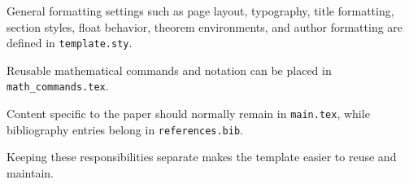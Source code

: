 \documentclass{article}
\begin{document}
	General formatting settings such as page layout, typography, title formatting, section styles, float behavior, theorem environments, and author formatting are defined in \texttt{template.sty}.
	
	Reusable mathematical commands and notation can be placed in \texttt{math\_commands.tex}.
	
	Content specific to the paper should normally remain in \texttt{main.tex}, while bibliography entries belong in \texttt{references.bib}.
	
	Keeping these responsibilities separate makes the template easier to reuse and maintain.
	
	
	
	
	
	
	
	
	
\end{document}
